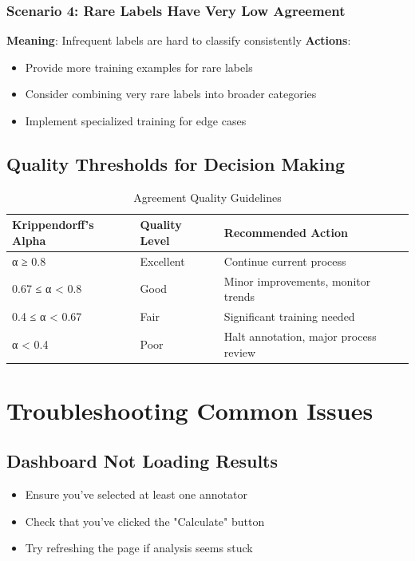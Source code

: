 \documentclass[11pt]{article}
\begin{document}
\subsubsection{Scenario 4: Rare Labels Have Very Low Agreement}
\textbf{Meaning}: Infrequent labels are hard to classify consistently
\textbf{Actions}:
\begin{itemize}
\item Provide more training examples for rare labels
\item Consider combining very rare labels into broader categories
\item Implement specialized training for edge cases
\end{itemize}

\subsection{Quality Thresholds for Decision Making}

\begin{table}[h]
\centering
\begin{tabular}{|l|l|l|}
\hline
\textbf{Krippendorff's Alpha} & \textbf{Quality Level} & \textbf{Recommended Action} \\
\hline
α ≥ 0.8 & Excellent & Continue current process \\
\hline
0.67 ≤ α < 0.8 & Good & Minor improvements, monitor trends \\
\hline
0.4 ≤ α < 0.67 & Fair & Significant training needed \\
\hline
α < 0.4 & Poor & Halt annotation, major process review \\
\hline
\end{tabular}
\caption{Agreement Quality Guidelines}
\end{table}

\section{Troubleshooting Common Issues}

\subsection{Dashboard Not Loading Results}
\begin{itemize}
\item Ensure you've selected at least one annotator
\item Check that you've clicked the "Calculate" button
\item Try refreshing the page if analysis seems stuck
\end{itemize}
\end{document}
